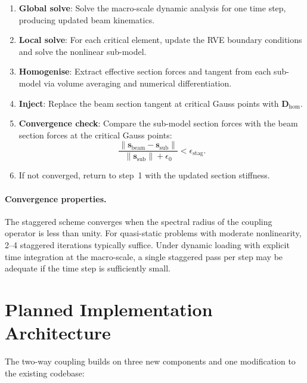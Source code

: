 \begin{enumerate}
  \item \textbf{Global solve}: Solve the macro-scale dynamic analysis
    for one time step, producing updated beam kinematics.
  \item \textbf{Local solve}: For each critical element, update the
    RVE boundary conditions and solve the nonlinear sub-model.
  \item \textbf{Homogenise}: Extract effective section forces and
    tangent from each sub-model via volume averaging and numerical
    differentiation.
  \item \textbf{Inject}: Replace the beam section tangent at critical
    Gauss points with $\mathbf{D}_{\text{hom}}$.
  \item \textbf{Convergence check}: Compare the sub-model section
    forces with the beam section forces at the critical Gauss points:
    \begin{equation}
      \label{eq:fe2-conv}
      \frac{\|\mathbf{s}_{\text{beam}} - \mathbf{s}_{\text{sub}}\|}
           {\|\mathbf{s}_{\text{sub}}\| + \epsilon_0}
      < \epsilon_{\text{stag}}.
    \end{equation}
  \item If not converged, return to step~1 with the updated section
    stiffness.
\end{enumerate}

\paragraph{Convergence properties.}
The staggered scheme converges when the spectral radius of the
coupling operator is less than unity.  For quasi-static problems
with moderate nonlinearity, 2--4 staggered iterations typically
suffice.  Under dynamic loading with explicit time integration at
the macro-scale, a single staggered pass per step may be adequate
if the time step is sufficiently small.


\section{Planned Implementation Architecture}
\label{sec:fe2-architecture}

The two-way coupling builds on three new components and one
modification to the existing codebase:

